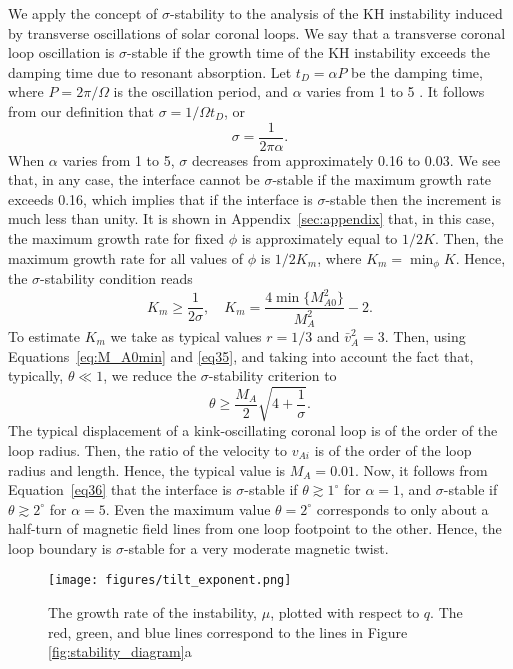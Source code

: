 We apply the concept of $\sigma$-stability to the analysis of the KH instability induced by transverse oscillations of solar coronal loops.
We say that a transverse coronal loop oscillation is $\sigma$-stable if the growth time of the KH instability exceeds the damping time due to resonant absorption.
Let $t_D = \alpha P$ be the damping time, where $P = 2 \pi / \Omega$ is the oscillation period, and $\alpha$ varies from 1 to 5 \citep[see, e.g.,][]{Goddard2016}.
It follows from our definition that $\sigma = 1/ \Omega t_D$, or
%
\begin{equation}
\label{eq34}
\sigma = \frac{1}{2\pi\alpha}.
\end{equation}
%
When $\alpha$ varies from 1 to 5, $\sigma$ decreases from approximately 0.16 to 0.03.
We see that, in any case, the interface cannot be $\sigma$\/-stable if the maximum growth rate exceeds 0.16, which implies that if the interface is $\sigma$\/-stable then the increment is much less than unity.
It is shown in Appendix~\ref{sec:appendix} that, in this case, the maximum growth rate for fixed $\phi$ is approximately equal to $1/2K$.
Then, the maximum growth rate for all values of $\phi$ is $1/2K_m$\/, where $K_m = \min_\phi K$.
Hence, the $\sigma$\/-stability condition reads
%
\begin{equation}
\label{eq35}
K_m \geq \frac1{2\sigma}, \quad K_m = \frac{4\min\{M_{A 0}^2\}}{M_A^2} - 2.
\end{equation}
%
To estimate $K_m$ we take as typical values $r = 1/3$ and $\bar v_A^2 = 3$.
Then, using Equations~\eqref{eq:M_A0min} and \eqref{eq35}, and taking into account the fact that, typically, $\theta \ll 1$, we reduce the $\sigma$-stability criterion to
%
\begin{equation}
\label{eq36}
\theta \geq \frac{M_A}{2} \sqrt{4 + \frac1\sigma}.
\end{equation}
%
The typical displacement of a kink-oscillating coronal loop is of the order of the loop radius.
Then, the ratio of the velocity to $v_{Ai}$ is of the order of the loop radius and length.
Hence, the typical value is $M_A = 0.01$.
Now, it follows from Equation~\eqref{eq36} that the interface is $\sigma$\/-stable if $\theta \gtrsim 1^\circ$ for $\alpha = 1$, and $\sigma$\/-stable if $\theta \gtrsim 2^\circ$ for $\alpha = 5$.
Even the maximum value $\theta = 2^\circ$ corresponds to only about a half-turn of magnetic field lines from one loop footpoint to the other.
Hence, the loop boundary is $\sigma$\/-stable for a very moderate magnetic twist.

\begin{figure}[t]
\centering
\texttt{[image: figures/tilt\_exponent.png]}
 \caption{The growth rate of the instability, $\mu$, plotted with respect to $q$. The red, green, and blue lines correspond to the lines in Figure \ref{fig:stability_diagram}a}
 \label{fig:mu}
\end{figure}

